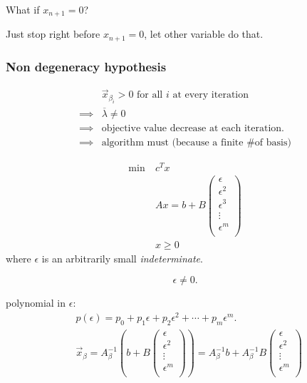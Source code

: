 \begin{problem}
What if \(x_{n+1} = 0\)?
\end{problem}
\begin{intuition}
	Just stop right before \(x_{n+1} = 0\), let other variable do that.
\end{intuition}

\subsubsection{Non degeneracy hypothesis}
\[
	\begin{split}
		&\vec{x}_{\beta_i} > 0 \text{ for all \(i\) at every iteration}\\
		\implies &\overline{\lambda} \neq 0\\
		\implies &\text{objective value decrease at each iteration.}\\
		\implies &\text{algorithm must (because a finite \# of basis)}
	\end{split}
\]

\begin{align*}
	\min~ & c^T x                    \\
	      & Ax = b + B\begin{pmatrix}
		                  \epsilon   \\
		                  \epsilon^2 \\
		                  \epsilon^3 \\
		                  \vdots     \\
		                  \epsilon^m \\
	                  \end{pmatrix} \\
	      & x\geq 0
\end{align*}
where \(\epsilon \) is an arbitrarily small \emph{indeterminate}.
\begin{remark}
	\[
		\epsilon \neq 0.
	\]
\end{remark}

\begin{observe}
	polynomial in \(\epsilon \):
	\[
		\begin{split}
			&p(\epsilon) = p_0 + p_1\epsilon + p_2 \epsilon^2 + \cdots + p_{m}\epsilon^m.	\\
			&\vec{x}_{\beta} = A^{-1}_{\beta}\left(b + B\begin{pmatrix}
					\epsilon   \\
					\epsilon^2 \\
					\vdots     \\
					\epsilon^m \\
				\end{pmatrix}\right) = A^{-1}_{\beta}b + A^{-1}_{\beta}B\begin{pmatrix}
				\epsilon   \\
				\epsilon^2 \\
				\vdots     \\
				\epsilon^m \\
			\end{pmatrix}
		\end{split}
	\]
\end{observe}


